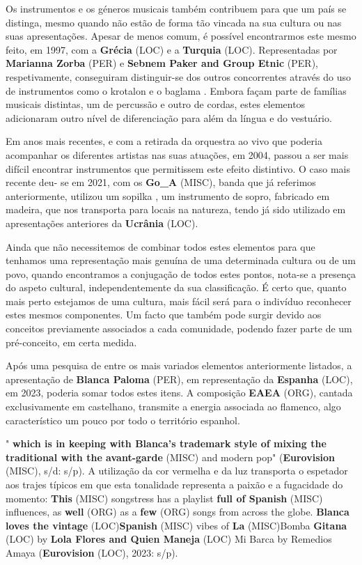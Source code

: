 \documentclass[12pt,a4paper]{article}
\begin{document}
Os instrumentos e os géneros musicais também contribuem para que um país se distinga,  mesmo  quando  não  estão  de  forma  tão  vincada  na  sua  cultura  ou  nas  suas apresentações. Apesar de menos comum, é possível encontrarmos este mesmo feito, em 1997, com a \textbf{Grécia} (LOC) e a \textbf{Turquia} (LOC). Representadas por \textbf{Marianna Zorba} (PER) e \textbf{Sebnem Paker and Group Etnic} (PER), respetivamente, conseguiram distinguir-se dos outros concorrentes através do uso de instrumentos como o krotalon e o baglama . Embora façam parte de famílias musicais distintas, um de percussão e outro de cordas, estes elementos adicionaram outro nível de diferenciação para além da língua e do vestuário.

Em  anos  mais  recentes,  e  com  a  retirada  da  orquestra  ao  vivo  que  poderia acompanhar os diferentes artistas nas suas atuações, em 2004, passou a ser mais difícil encontrar instrumentos que permitissem este efeito distintivo. O caso mais recente deu- se em 2021, com os \textbf{Go\_A} (MISC), banda que já referimos anteriormente, utilizou um sopilka , um  instrumento  de  sopro,  fabricado  em  madeira,  que  nos  transporta  para  locais  na natureza, tendo já sido utilizado em apresentações anteriores da \textbf{Ucrânia} (LOC).

Ainda  que  não  necessitemos  de  combinar  todos  estes  elementos  para  que tenhamos uma representação mais genuína de uma determinada cultura ou de um povo, quando encontramos  a conjugação de todos estes pontos,  nota-se a presença do aspeto cultural,  independentemente  da  sua  classificação.  É  certo  que,  quanto  mais  perto estejamos  de  uma  cultura,  mais  fácil  será  para  o  indivíduo  reconhecer  estes  mesmos componentes.  Um  facto  que  também  pode  surgir  devido  aos  conceitos  previamente associados a cada comunidade, podendo fazer parte de um pré-conceito, em certa medida.

Após  uma  pesquisa  de  entre  os  mais  variados  elementos  anteriormente  listados,  a apresentação de \textbf{Blanca Paloma} (PER), em representação da \textbf{Espanha} (LOC), em 2023, poderia somar todos estes itens. A composição \textbf{EAEA} (ORG), cantada exclusivamente em castelhano, transmite a  energia  associada  ao  flamenco,  algo  característico  um  pouco  por  todo  o  território espanhol.

" \textbf{which is in keeping with Blanca's trademark style of mixing the traditional with the avant-garde} (MISC) and modern pop" (\textbf{Eurovision} (MISC), s/d: s/p). A utilização da cor vermelha e  da  luz  transporta  o  espetador  aos  trajes  típicos  em  que  esta  tonalidade  representa  a paixão e a fugacidade do momento: \textbf{This} (MISC) songstress has a playlist \textbf{full of Spanish} (MISC) influences, as \textbf{well} (ORG) as a \textbf{few} (ORG) songs from across the  globe.  \textbf{Blanca  loves  the  vintage} (LOC)\textbf{Spanish} (MISC)  vibes  of \textbf{La} (MISC)Bomba  \textbf{Gitana} (LOC) by  \textbf{Lola  Flores and Quien Maneja} (LOC) Mi Barca by Remedios Amaya (\textbf{Eurovision} (LOC), 2023: s/p).
\end{document}
